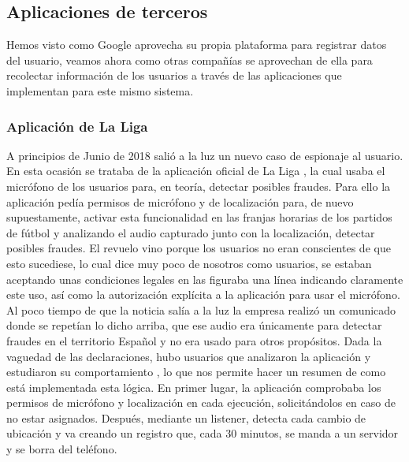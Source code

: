 \documentclass[12pt,a4paper,oneside]{book} %
\begin{document}
\subsection{Aplicaciones de terceros}
Hemos visto como Google aprovecha su propia plataforma para registrar datos del usuario, veamos ahora como otras compañías se aprovechan de ella para recolectar información de los usuarios a través de las aplicaciones que implementan para este mismo sistema. 
\subsubsection{Aplicación de La Liga}
A principios de Junio de 2018 salió a la luz un nuevo caso de espionaje al usuario. En esta ocasión se trataba de la aplicación oficial de La Liga \cite{noticiaLaLiga}, la cual usaba el micrófono de los usuarios para, en teoría, detectar posibles fraudes. 
\newline \newline 
Para ello la aplicación pedía permisos de micrófono y de localización para, de nuevo supuestamente, activar esta funcionalidad en las franjas horarias de los partidos de fútbol y analizando el audio capturado junto con la localización, detectar posibles fraudes. 
\newline \newline 
El revuelo vino porque los usuarios no eran conscientes de que esto sucediese, lo cual dice muy poco de nosotros como usuarios, se estaban aceptando unas condiciones legales en las figuraba una línea indicando claramente este uso, así como la autorización explícita a la aplicación para usar el micrófono. 
\newline \newline 
Al poco tiempo de que la noticia salía a la luz la empresa realizó un comunicado donde se repetían lo dicho arriba, que ese audio era únicamente para detectar fraudes en el territorio Español y no era usado para otros propósitos. Dada la vaguedad de las declaraciones, hubo usuarios que analizaron la aplicación y estudiaron su comportamiento \cite{laLigaJaker}, lo que nos permite hacer un resumen de como está implementada esta lógica. 
\newline \newline 
En primer lugar, la aplicación comprobaba los permisos de micrófono y localización en cada ejecución, solicitándolos en caso de no estar asignados. Después, mediante un listener, detecta cada cambio de ubicación y va creando un registro que, cada 30 minutos, se manda a un servidor y se borra del teléfono. 
\end{document}
